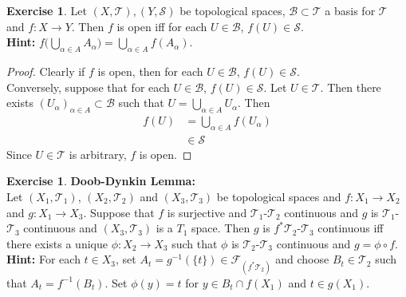\documentclass[12pt]{amsart}
\theoremstyle{definition}
\newtheorem{ex}[definition]{Exercise}
\newcommand{\al}{\alpha}
\newcommand{\MB}{\mathcal{B}}
\newcommand{\MF}{\mathcal{F}}
\newcommand{\MS}{\mathcal{S}}
\newcommand{\MT}{\mathcal{T}}
\newcommand{\tbf}[1]{\textbf{#1}}
\DeclareMathOperator*{\0}{\mbf{0}}
\DeclareMathOperator*{\1}{\mbf{1}}
\newcommand{\lex}[1]{\label{ex:#1}}
\begin{document}
	\begin{ex}
		Let $(X, \MT), (Y, \MS)$ be topological spaces, $\MB \subset \MT$ a basis for $\MT$ and $f: X \rightarrow Y$. Then $f$ is open iff for each $U \in \MB$, $f(U) \in \MS$.\\
		\tbf{Hint:} $f\bigg( \bigcup\limits_{\al \in A} A_{\al} \bigg) =  \bigcup\limits_{\al \in A} f(A_{\al})$.
	\end{ex}

	\begin{proof}
		Clearly if $f$ is open, then for each $U \in \MB$, $f(U) \in \MS$.\\
		Conversely, suppose that for each $U \in \MB$, $f(U) \in \MS$. Let $U \in \MT$. Then there exists $(U_{\al})_{\al \in A} \subset \MB$ such that $U =  \bigcup\limits_{\al \in A} U_{\al}$. Then 
		\begin{align*}
			f(U) 
			& = \bigcup\limits_{\al \in A} f(U_{\al}) \\
			& \in \MS
		\end{align*}
		Since $U \in \MT$ is arbitrary, $f$ is open.
	\end{proof}
	
	\begin{ex}\lex{} \tbf{Doob-Dynkin Lemma:} \\
	Let $(X_1, \MT_1)$, $(X_2, \MT_2)$ and $(X_3, \MT_3)$ be topological spaces and $f: X_1 \rightarrow X_2$ and $g:X_1 \rightarrow X_3$. Suppose that $f$ is surjective and $\MT_1$-$\MT_2$ continuous and $g$ is $\MT_1$-$\MT_3$ continuous and $(X_3, \MT_3)$ is a $T_1$ space. Then $g$ is $f^*\MT_2$-$\MT_3$ continuous iff there exists a unique $\phi: X_2 \rightarrow X_3$ such that $\phi$ is $\MT_2$-$\MT_3$ continuous and $g = \phi \circ f$. \\
	\tbf{Hint:} For each $t \in X_3$, set $A_t = g^{-1}(\{t\}) \in \MF_{(f^* \MT_2)}$ and choose $B_t \in \MT_2$ such that $A_t = f^{-1}(B_t)$. Set $\phi(y) = t$ for $y \in B_t \cap f(X_1)$ and $t \in g(X_1)$.
	\end{ex}
	
\end{document}
